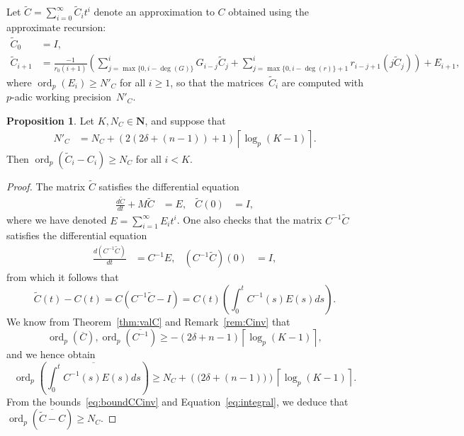 \documentclass[a4paper,11pt]{article}
\numberwithin{equation}{section}
\providecommand{\ceil}[1]{\left\lceil#1\right\rceil}   %
\newcommand{\NN}{\mathbf{N}} %
\DeclareMathOperator{\ord}{ord}          %
\theoremstyle{definition}
\newtheorem{prop}[thm]{Proposition}
\begin{document}
Let $\tilde{C}=\sum_{i=0}^{\infty} \tilde{C}_i t^i$ denote an 
approximation to $C$ obtained using the approximate recursion:  
\begin{align*}
\tilde{C}_0 &= I, \\
\tilde{C}_{i+1} &= \frac{-1}{r_0 (i+1)} \left(
    \sum_{j=\max{\{0,i-\deg({G})\}}}^i {G}_{i-j} \tilde{C}_j + 
    \sum_{j=\max{\{0,i-\deg({r})\}}+1}^i {r}_{i-j+1} (j \tilde{C}_j) \right) + {E}_{i+1},
\end{align*}
where $\ord_p({E}_i) \geq N'_{C}$ for all $i \geq 1$, 
so that the matrices~$\tilde{C}_i$ are computed with $p$-adic working 
precision~$N'_C$.

\begin{prop} \label{thm:errorprop}
Let $K,N_{C} \in \NN$, and suppose that
\begin{align*}
N'_C          &= N_{C} + \left(2 \left(2 \delta + (n-1)\right) + 1\right) \ceil{\log_p(K-1)}.
\end{align*} 
Then $\ord_p(\tilde{C}_i-C_i) \geq N_{C}$ for all $i < K$.
\end{prop}

\begin{proof}
The matrix $\tilde{C}$ satisfies the differential equation
\begin{align*}
\frac{d\tilde{C}}{dt}+M \tilde{C}&=E, &\tilde{C}(0)&=I,
\end{align*}
where we have denoted $E=\sum_{i=1}^{\infty} E_i t^i$.
One also checks that the matrix $C^{-1}\tilde{C}$ satisfies 
the differential equation
\begin{align*}
\frac{d(C^{-1}\tilde{C})}{dt} &=C^{-1} E, &(C^{-1}\tilde{C})(0)&=I,
\end{align*}
from which it follows that
\begin{equation} \label{eq:integral}
\tilde{C}(t)-C(t) = C(C^{-1} \tilde{C}-I) = C(t) \left(\int_{0}^t C^{-1}(s) E(s) ds \right).
\end{equation}
We know from Theorem~\ref{thm:valC} and Remark~\ref{rem:Cinv} that
\begin{equation} \label{eq:boundCCinv}
\ord_p(\overline{C}),\ord_p(\overline{C^{-1}}) \geq 
-(2 \delta + n-1) \ceil{\log_p(K-1)},
\end{equation}
and we hence obtain
\[
\ord_p \left(\overline{\int_{0}^t C^{-1}(s) E(s) ds }\right) \geq 
N_{C} + \left( \bigl(2 \delta + (n-1)\bigr) \right) \ceil{\log_p(K-1)}.
\]
From the bounds~\eqref{eq:boundCCinv} and Equation~\eqref{eq:integral}, 
we deduce that $\ord_p\left(\overline{\tilde{C}-C}\right) \geq N_C$.
\end{proof}
\end{document}

